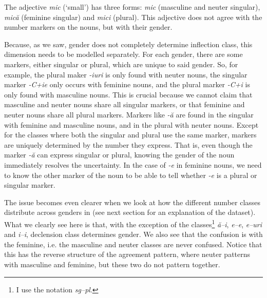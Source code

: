 The adjective \textit{mic} (`small') has three forms: \textit{mic} (masculine and neuter singular), \textit{mică} (feminine singular) and \textit{mici} (plural). This adjective does not agree with the number markers on the nouns, but with their gender.

Because, as we saw, gender does not completely determine inflection class, this dimension needs to be modelled separately. For each gender, there are some markers, either singular or plural, which are unique to said gender. So, for example, the plural maker \textit{-iuri} is only found with neuter nouns, the singular marker \textit{-C+ie} only occurs with feminine nouns, and the plural marker \textit{-C+i} is only found with masculine nouns. This is crucial because we cannot claim that masculine and neuter nouns share all singular markers, or that feminine and neuter nouns share all plural markers. Markers like \textit{-ă} are found in the singular with feminine and masculine nouns, and in the plural with neuter nouns. Except for the classes where both the singular and plural use the same marker, markers are uniquely determined by the number they express. That is, even though the marker \textit{-ă} can express singular or plural, knowing the gender of the noun immediately resolves the uncertainty. In the case of \textit{-e} in feminine nouns, we need to know the other marker of the noun to be able to tell whether \textit{-e} is a plural or singular marker.

The issue becomes even clearer when we look at how the different number classes distribute across genders in  (see next section for an explanation of the dataset). What we clearly see here is that, with the exception of the classes\footnote{I use the notation \textit{sg--pl}.} \textit{ă--i}, \textit{e--e}, \textit{e--uri} and \textit{i--i}, declension class determines gender. We also see that the confusion is with the feminine, i.e. the masculine and neuter classes are never confused. Notice that this has the reverse structure of the agreement pattern, where neuter patterns with masculine and feminine, but these two do not pattern together.

